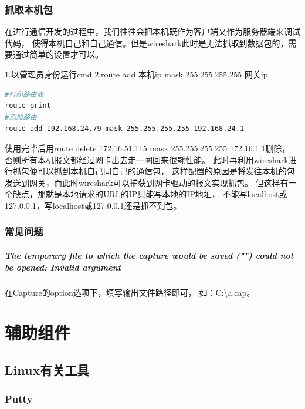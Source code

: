 \documentclass{book}
\begin{document}
\subsection{抓取本机包}

在进行通信开发的过程中，我们往往会把本机既作为客户端又作为服务器端来调试代码，
使得本机自己和自己通信。但是wireshark此时是无法抓取到数据包的，需要通过简单的设置才可以。

1.以管理员身份运行cmd
2.route add 本机ip mask 255.255.255.255 网关ip

\begin{lstlisting}[language=Bash]
#打印路由表
route print
#添加路由
route add 192.168.24.79 mask 255.255.255.255 192.168.24.1
\end{lstlisting}

使用完毕后用route delete 172.16.51.115 mask 255.255.255.255 172.16.1.1删除，
否则所有本机报文都经过网卡出去走一圈回来很耗性能。
此时再利用wireshark进行抓包便可以抓到本机自己同自己的通信包，
这样配置的原因是将发往本机的包发送到网关，而此时wireshark可以捕获到网卡驱动的报文实现抓包。
但这样有一个缺点，那就是本地请求的URL的IP只能写本地的IP地址，
不能写localhost或127.0.0.1，写localhost或127.0.0.1还是抓不到包。


\subsection{常见问题}

\paragraph{The temporary file to which the capture would be saved ("") could not be opened: Invalid argument}

在Capture的option选项下，填写输出文件路径即可，
如：C:\textbackslash a.cap。


\chapter{辅助组件}

\clearpage

\section{Linux有关工具}






\subsection{Putty}
\end{document}
